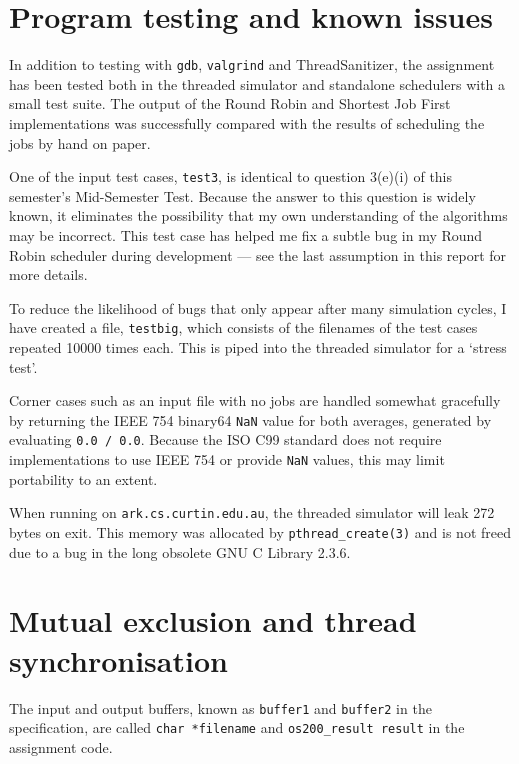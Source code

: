\documentclass[a4paper,12pt,titlepage]{article}
\begin{document}
\newpage

\section{Program testing and known issues}

In addition to testing with \texttt{gdb}, \texttt{valgrind} and
ThreadSanitizer, the assignment has been tested both in the threaded simulator
and standalone schedulers with a small test suite. The output of the Round
Robin and Shortest Job First implementations was successfully compared with the
results of scheduling the jobs by hand on paper.

One of the input test cases, \texttt{test3}, is identical to question 3(e)(i)
of this semester's Mid-Semester Test. Because the answer to this question is
widely known, it eliminates the possibility that my own understanding of the
algorithms may be incorrect. This test case has helped me fix a subtle bug in
my Round Robin scheduler during development --- see the last assumption in this
report for more details.

To reduce the likelihood of bugs that only appear after many simulation cycles,
I have created a file, \texttt{testbig}, which consists of the filenames of the
test cases repeated 10000 times each. This is piped into the threaded simulator
for a `stress test'.

Corner cases such as an input file with no jobs are handled somewhat gracefully
by returning the IEEE 754 binary64 \texttt{NaN} value for both averages,
generated by evaluating \texttt{0.0 / 0.0}. Because the ISO C99 standard does
not require implementations to use IEEE 754 or provide \texttt{NaN} values,
this may limit portability to an extent.

When running on \texttt{ark.cs.curtin.edu.au}, the threaded simulator will leak
272 bytes on exit. This memory was allocated by \texttt{pthread\_create(3)} and
is not freed due to a bug in the long obsolete GNU C Library 2.3.6.

\newpage

\section{Mutual exclusion and thread synchronisation}

The input and output buffers, known as \texttt{buffer1} and \texttt{buffer2}
in the specification, are called \texttt{char *filename} and
\texttt{os200\_result result} in the assignment code.
\end{document}
